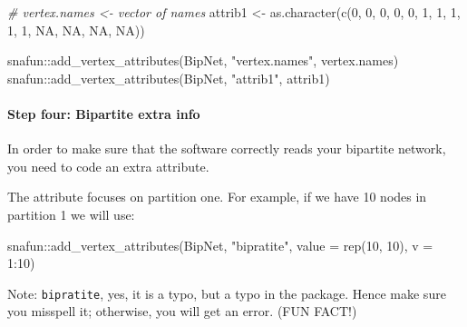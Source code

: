 \documentclass[
]{article}
\newenvironment{Shaded}{\begin{snugshade}}{\end{snugshade}}
\newcommand{\AttributeTok}[1]{\textcolor[rgb]{0.77,0.63,0.00}{#1}}
\newcommand{\CommentTok}[1]{\textcolor[rgb]{0.56,0.35,0.01}{\textit{#1}}}
\newcommand{\ConstantTok}[1]{\textcolor[rgb]{0.00,0.00,0.00}{#1}}
\newcommand{\DecValTok}[1]{\textcolor[rgb]{0.00,0.00,0.81}{#1}}
\newcommand{\FunctionTok}[1]{\textcolor[rgb]{0.00,0.00,0.00}{#1}}
\newcommand{\NormalTok}[1]{#1}
\newcommand{\OtherTok}[1]{\textcolor[rgb]{0.56,0.35,0.01}{#1}}
\newcommand{\SpecialCharTok}[1]{\textcolor[rgb]{0.00,0.00,0.00}{#1}}
\newcommand{\StringTok}[1]{\textcolor[rgb]{0.31,0.60,0.02}{#1}}
\begin{document}
\begin{Shaded}
\begin{Highlighting}[]

\CommentTok{\# vertex.names \textless{}{-} vector of names}
\NormalTok{attrib1 }\OtherTok{\textless{}{-}} \FunctionTok{as.character}\NormalTok{(}\FunctionTok{c}\NormalTok{(}\DecValTok{0}\NormalTok{, }\DecValTok{0}\NormalTok{, }\DecValTok{0}\NormalTok{, }\DecValTok{0}\NormalTok{, }\DecValTok{0}\NormalTok{, }\DecValTok{1}\NormalTok{, }\DecValTok{1}\NormalTok{, }\DecValTok{1}\NormalTok{, }\DecValTok{1}\NormalTok{, }\DecValTok{1}\NormalTok{, }\ConstantTok{NA}\NormalTok{, }\ConstantTok{NA}\NormalTok{, }\ConstantTok{NA}\NormalTok{, }\ConstantTok{NA}\NormalTok{))}

\NormalTok{snafun}\SpecialCharTok{::}\FunctionTok{add\_vertex\_attributes}\NormalTok{(BipNet, }\StringTok{"vertex.names"}\NormalTok{,  vertex.names)}
\NormalTok{snafun}\SpecialCharTok{::}\FunctionTok{add\_vertex\_attributes}\NormalTok{(BipNet, }\StringTok{"attrib1"}\NormalTok{,  attrib1)}
\end{Highlighting}
\end{Shaded}

\hypertarget{step-four-bipartite-extra-info}{%
\paragraph{Step four: Bipartite extra
info}\label{step-four-bipartite-extra-info}}

In order to make sure that the software correctly reads your bipartite
network, you need to code an extra attribute.

The attribute focuses on partition one. For example, if we have 10 nodes
in partition 1 we will use:

\begin{Shaded}
\begin{Highlighting}[]

\NormalTok{snafun}\SpecialCharTok{::}\FunctionTok{add\_vertex\_attributes}\NormalTok{(BipNet, }\StringTok{"bipratite"}\NormalTok{, }\AttributeTok{value =} \FunctionTok{rep}\NormalTok{(}\DecValTok{10}\NormalTok{, }\DecValTok{10}\NormalTok{), }\AttributeTok{v =} \DecValTok{1}\SpecialCharTok{:}\DecValTok{10}\NormalTok{)}
\end{Highlighting}
\end{Shaded}

Note: \texttt{bipratite}, yes, it is a typo, but a typo in the package.
Hence make sure you misspell it; otherwise, you will get an error. (FUN
FACT!)
\end{document}
